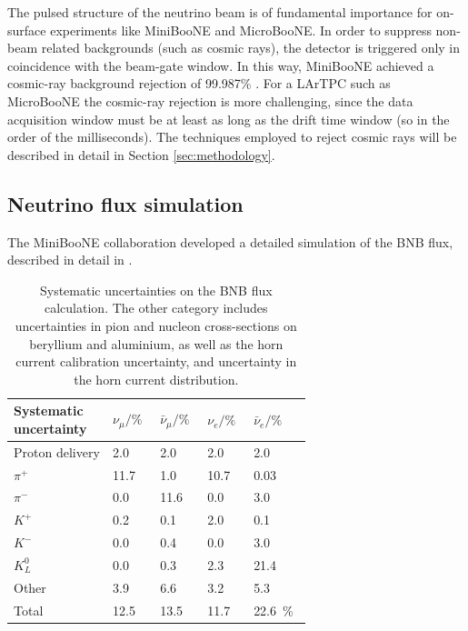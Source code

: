 The pulsed structure of the neutrino beam is of fundamental importance for on-surface experiments like MiniBooNE and MicroBooNE. In order to suppress non-beam related backgrounds (such as cosmic rays), the detector is triggered only in coincidence with the beam-gate window. In this way, MiniBooNE achieved a cosmic-ray background rejection of 99.987\% \cite{AguilarArevalo:2008qa}. For a LArTPC such as MicroBooNE the cosmic-ray rejection is more challenging, since the data acquisition window must be at least as long as the drift time window (so in the order of the milliseconds). The techniques employed to reject cosmic rays will be described in detail in Section \ref{sec:methodology}.
 
\subsection{Neutrino flux simulation}
The MiniBooNE collaboration developed a detailed simulation of the BNB flux, described in detail in \cite{AguilarArevalo:2008yp}. 

\begin{table}[htbp]
   \centering
     \caption{Systematic uncertainties on the BNB flux calculation. The other category includes uncertainties in pion and nucleon cross-sections on beryllium and aluminium, as well as the horn current calibration uncertainty, and uncertainty in the horn current distribution.}
   \begin{tabular}{p{0.25\linewidth}p{0.1\linewidth}p{0.1\linewidth}p{0.1\linewidth}p{0.1\linewidth}}
     \toprule
     Systematic uncertainty & $\nu_{\mu}/\%$ & $\bar{\nu}_{\mu}/\%$ & $\nu_e/\%$ & $\bar{\nu}_e/\%$ \\
     \midrule
     Proton delivery & 2.0 & 2.0 & 2.0 & 2.0 \\
     $\pi^+$ & 11.7 & 1.0 & 10.7 & 0.03 \\ 
     $\pi^-$ & 0.0 & 11.6 & 0.0 & 3.0 \\
     $K^+$ & 0.2 & 0.1 & 2.0 & 0.1 \\
     $K^-$ & 0.0 & 0.4 & 0.0 & 3.0 \\
     $K^0_L$ & 0.0 & 0.3 & 2.3 & 21.4 \\
     Other & 3.9 & 6.6 & 3.2 & 5.3 \\
     \midrule
     Total & 12.5 & 13.5 & 11.7 & 22.6~\%\\
     \bottomrule
   \end{tabular}
\label{tab:flux_syst}
\end{table}

